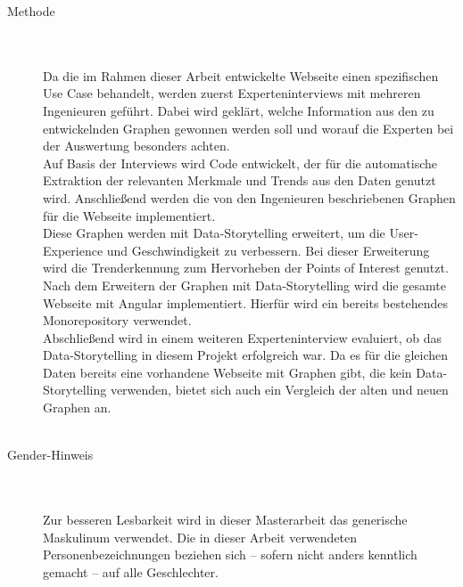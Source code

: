 \begin{description}
\item[Methode]\hfill \\\\
Da die im Rahmen dieser Arbeit entwickelte Webseite einen spezifischen Use Case behandelt, werden zuerst Experteninterviews mit mehreren Ingenieuren geführt. Dabei wird geklärt, welche Information aus den zu entwickelnden Graphen gewonnen werden soll und worauf die Experten bei der Auswertung besonders achten. \\
Auf Basis der Interviews wird Code entwickelt, der für die automatische Extraktion der relevanten Merkmale und Trends aus den Daten genutzt wird. Anschließend werden die von den Ingenieuren beschriebenen Graphen für die Webseite implementiert.\\
Diese Graphen werden mit Data-Storytelling erweitert, um die User-Experience und Geschwindigkeit zu verbessern. Bei dieser Erweiterung wird die Trenderkennung zum Hervorheben der Points of Interest genutzt. Nach dem Erweitern der Graphen mit Data-Storytelling wird die gesamte Webseite mit Angular implementiert. Hierfür wird ein bereits bestehendes Monorepository verwendet.\\
Abschließend wird in einem weiteren Experteninterview evaluiert, ob das Data-Storytelling in diesem Projekt erfolgreich war. Da es für die gleichen Daten bereits eine vorhandene Webseite mit Graphen gibt, die kein Data-Storytelling verwenden, bietet sich auch ein Vergleich der alten und neuen Graphen an.\\\\
\item[Gender-Hinweis]\hfill \\\\
Zur besseren Lesbarkeit wird in dieser Masterarbeit das generische Maskulinum verwendet. Die in dieser Arbeit verwendeten Personenbezeichnungen beziehen sich – sofern nicht anders kenntlich gemacht – auf alle Geschlechter.
\end{description}

